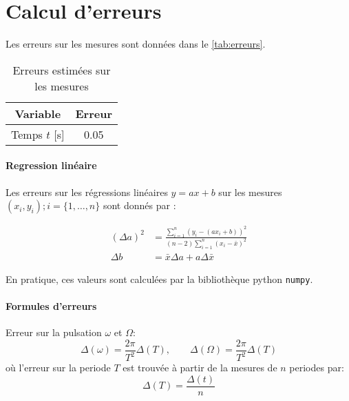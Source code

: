 \section{Calcul d'erreurs}
\label{sec:erreurs}

Les erreurs sur les mesures sont données dans le \autoref{tab:erreurs}.

\begin{table}[h]
    \centering
    \begin{tabulary}{\textwidth}{C C}
        \toprule
        Variable & Erreur \\
        \midrule
        Temps \(t\) [\si{\second}] & 0.05 \\
        \bottomrule
    \end{tabulary}
    \caption{Erreurs estimées sur les mesures}
    \label{tab:erreurs}
\end{table}

\paragraph*{Regression linéaire}
Les erreurs sur les régressions linéaires \(y = ax + b\) sur les mesures \((x_i, y_i) ; i = \{1, \dots, n\}\) sont donnés par \cite{erreursmesure}:

\begin{equation}
    \label{eq:erreur:fit}
    \begin{aligned}
        (\Delta a)^2 &= \frac{\sum_{i=1}^{n}(y_i - (a x_i + b))^2}{(n-2) \sum_{i=1}^{n}(x_i - \bar{x})^2}\\
        \Delta b &= \bar{x} \Delta a + a \Delta \bar{x}
    \end{aligned}
\end{equation}

En pratique, ces valeurs sont calculées par la bibliothèque python \texttt{numpy}.

\paragraph*{Formules d'erreurs}

Erreur sur la pulsation \(\omega\) et \(\Omega\):
\begin{equation}
    \Delta (\omega) = \frac{2 \pi}{T^2} \Delta (T), \qquad
    \Delta (\Omega) = \frac{2 \pi}{T^2} \Delta (T)
\end{equation}
où l'erreur sur la periode \(T\) est trouvée à partir de la mesures de \(n\) periodes par:
\begin{equation}
    \Delta (T) = \frac{\Delta (t)}{n}
\end{equation}

